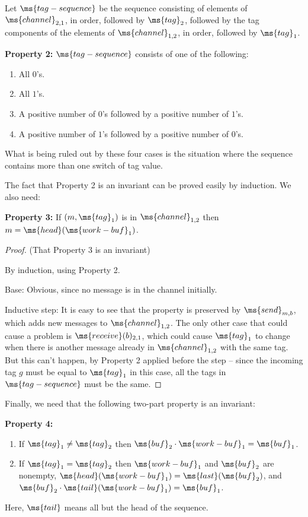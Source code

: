 Let $\ms{tag-sequence}$ be the sequence consisting of elements of
$\ms{channel}_{2,1}$, in order, 
followed by $\ms{tag}_2$, 
followed by the tag components of the elements of
$\ms{channel}_{1,2}$, in order, 
followed by $\ms{tag}_1$. 

{\bf Property 2:}
$\ms{tag-sequence}$ consists of one of the following:
\begin{enumerate}
\item
All $0$'s.
\item
All $1$'s. 
\item
A positive number of $0$'s followed by a positive number of $1$'s.
\item
A positive number of $1$'s followed by a positive number of $0$'s.
\end{enumerate}
What is being ruled out by these four cases is the situation where
the sequence contains more than one switch of tag value. 

The fact that Property 2 is an invariant can be proved easily by
induction.  We also need: 

{\bf Property 3:}
If $(m,\ms{tag}_1)$ is in $\ms{channel}_{1,2}$ then $m =
\ms{head}(\ms{work-buf}_1)$. \\



\begin{proof}
(That Property 3 is an invariant)

By induction, using Property 2. 

Base: Obvious, since no message is in the channel initially. 

Inductive step: It is easy to see that the property is preserved by
$\ms{send}_{m,b}$, which adds new messages to $\ms{channel}_{1,2}$.
The only other case that could cause a problem is
$\ms{receive}(b)_{2,1}$,
which could cause $\ms{tag}_1$ to change when there is another message
already in $\ms{channel}_{1,2}$ with the same tag. 
But this can't happen, by Property 2 applied before the step -- since
the incoming tag $g$ must be equal to $\ms{tag}_1$ in this case,
all the tags in $\ms{tag-sequence}$ must be the same.
\end{proof}

Finally, we need that the following two-part property is an invariant: 

{\bf Property 4:}
\begin{enumerate}
\item
If $\ms{tag}_1 \neq \ms{tag}_2$ then
$\ms{buf}_2 \cdot \ms{work-buf}_1 = \ms{buf}_1$. 
\item
If $\ms{tag}_1 = \ms{tag}_2$ then 
$\ms{work-buf}_1$ and $\ms{buf}_2$ are nonempty, 
$\ms{head}(\ms{work-buf}_1) = \ms{last}(\ms{buf}_2)$, and 
$\ms{buf}_2 \cdot \ms{tail}(\ms{work-buf}_1) = \ms{buf}_1$. 
\end{enumerate}
Here, $\ms{tail}$ means all but the head of the sequence.

